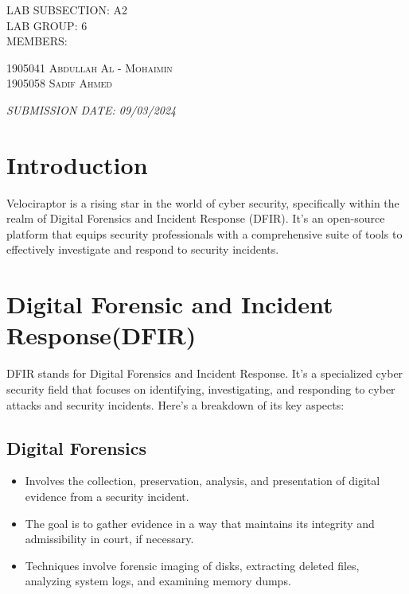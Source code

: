 \documentclass[a4paper, 11pt, oneside]{article} %
\begin{document}
\begin{titlepage}
        \vspace*{2\baselineskip} %
	
	
	LAB SUBSECTION: A2 \\
        \vspace{0.75\baselineskip}
        LAB GROUP: 6 \\
        \vspace{0.75\baselineskip}
        MEMBERS:
	
	\vspace{0.75\baselineskip} %
	
	{\scshape\Large 1905041 Abdullah Al - Mohaimin
    \\\vspace{0.5\baselineskip} 1905058 Sadif Ahmed} %
	
	\vspace{1\baselineskip} %
	
	\textit{SUBMISSION DATE: 09/03/2024} %
	

\end{titlepage}

\tableofcontents
\newpage

\justifying

\section{Introduction}
Velociraptor is a rising star in the world of cyber security, specifically within the realm of Digital Forensics and Incident Response (DFIR). It's an open-source platform that equips security professionals with a comprehensive suite of tools to effectively investigate and respond to security incidents.

\section{Digital Forensic and Incident Response(DFIR)}
DFIR stands for Digital Forensics and Incident Response. It's a specialized cyber security field that focuses on identifying, investigating, and responding to cyber attacks and security incidents. Here's a breakdown of its key aspects:

\subsection{Digital Forensics}
\begin{itemize}
    \item Involves the collection, preservation, analysis, and presentation of digital evidence from a security incident.
    \item The goal is to gather evidence in a way that maintains its integrity and admissibility in court, if necessary.
    \item Techniques involve forensic imaging of disks, extracting deleted files, analyzing system logs, and examining memory dumps.
\end{itemize}
\end{document}
